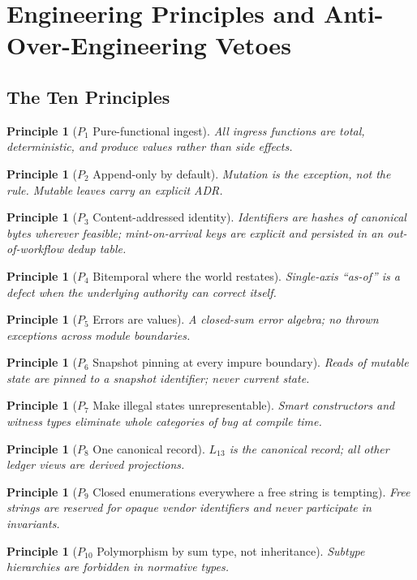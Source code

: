\documentclass[11pt,a4paper]{article}
\newtheorem{principle}[definition]{Principle}
\begin{document}
\clearpage
\section{Engineering Principles and Anti-Over-Engineering Vetoes}
\label{sec:principles}

\subsection{The Ten Principles}
\label{sec:principles-ten}

\begin{principle}[$P_1$ Pure-functional ingest] All ingress functions are total, deterministic, and produce values rather than side effects.\end{principle}
\begin{principle}[$P_2$ Append-only by default] Mutation is the exception, not the rule. Mutable leaves carry an explicit ADR.\end{principle}
\begin{principle}[$P_3$ Content-addressed identity] Identifiers are hashes of canonical bytes wherever feasible; mint-on-arrival keys are explicit and persisted in an out-of-workflow dedup table.\end{principle}
\begin{principle}[$P_4$ Bitemporal where the world restates] Single-axis ``as-of'' is a defect when the underlying authority can correct itself.\end{principle}
\begin{principle}[$P_5$ Errors are values] A closed-sum error algebra; no thrown exceptions across module boundaries.\end{principle}
\begin{principle}[$P_6$ Snapshot pinning at every impure boundary] Reads of mutable state are pinned to a snapshot identifier; never current state.\end{principle}
\begin{principle}[$P_7$ Make illegal states unrepresentable] Smart constructors and witness types eliminate whole categories of bug at compile time.\end{principle}
\begin{principle}[$P_8$ One canonical record] $L_{13}$ is the canonical record; all other ledger views are derived projections.\end{principle}
\begin{principle}[$P_9$ Closed enumerations everywhere a free string is tempting] Free strings are reserved for opaque vendor identifiers and never participate in invariants.\end{principle}
\begin{principle}[$P_{10}$ Polymorphism by sum type, not inheritance] Subtype hierarchies are forbidden in normative types.\end{principle}
\end{document}
